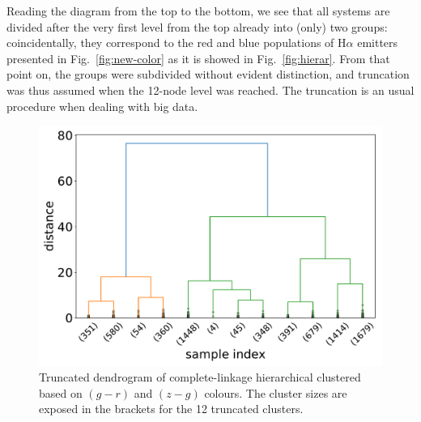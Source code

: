 \documentclass[fleqn,usenatbib]{mnras}
\begin{document}
Reading the diagram from the top to the bottom, we see that all systems are divided after the very first level from the top already into (only) two groups: coincidentally, they correspond to the red and blue populations of H$\alpha$ emitters presented in Fig.~\ref{fig:new-color} as it is showed in Fig.~\ref{fig:hierar}. From that point on, the groups were subdivided without evident distinction, and truncation was thus assumed when the 12-node level was reached. The truncation is an usual procedure when dealing with big data. 




\begin{figure}
	\includegraphics[width=0.9\linewidth]{Figs/Customer-Dendrograms.pdf}
    \caption{Truncated dendrogram of complete-linkage hierarchical clustered based on $(g - r)$ and $(z - g)$ colours.
    The cluster sizes are exposed in the brackets for the 12 truncated clusters.}
    \label{fig:dendrogram}
\end{figure}
\end{document}

